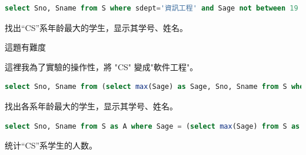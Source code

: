 \documentclass[12pt, a4paper]{report}
\begin{document}
\begin{lstlisting}[language=SQL]
    select Sno, Sname from S where sdept='資訊工程' and Sage not between 19 and 21;
\end{lstlisting}

\begin{figure}[H] %
    \centering %
\end{figure}
找出“CS”系年龄最大的学生，显示其学号、姓名。

這題有難度

這裡我為了實驗的操作性，將 "CS" 變成"軟件工程"。\\

\begin{lstlisting}[language=SQL]
    select Sno, Sname from (select max(Sage) as Sage, Sno, Sname from S where sdept='軟件工程');
\end{lstlisting}

\begin{figure}[H] %
    \centering %
\end{figure}
找出各系年龄最大的学生，显示其学号、姓名。\\

\begin{lstlisting}[language=SQL]
    select Sno, Sname from S as A where Sage = (select max(Sage) from S as B where A.Sdept = B.Sdept);
\end{lstlisting}

\begin{figure}[H] %
    \centering %
\end{figure}
统计“CS”系学生的人数。\\
\end{document}
